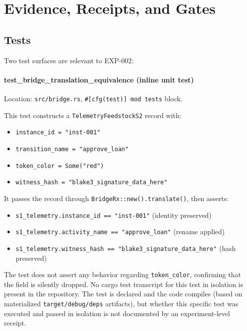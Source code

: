 
\section{Evidence, Receipts, and Gates}
\label{sec:otel-weaver-exp-002-diff-to-residual-evidence}

\subsection{Tests}
\label{sec:otel-weaver-exp-002-diff-to-residual-evidence-tests}

Two test surfaces are relevant to EXP-002:

\paragraph{test\_bridge\_translation\_equivalence (inline unit test)}
Location: \texttt{src/bridge.rs}, \texttt{\#[cfg(test)] mod tests} block.

This test constructs a \texttt{TelemetryFeedstockS2} record with:
\begin{itemize}
    \item \texttt{instance\_id = "inst-001"}
    \item \texttt{transition\_name = "approve\_loan"}
    \item \texttt{token\_color = Some("red")}
    \item \texttt{witness\_hash = "blake3\_signature\_data\_here"}
\end{itemize}
It passes the record through \texttt{BridgeRx::new().translate()}, then asserts:
\begin{itemize}
    \item \texttt{s1\_telemetry.instance\_id == "inst-001"} (identity preserved)
    \item \texttt{s1\_telemetry.activity\_name == "approve\_loan"} (rename applied)
    \item \texttt{s1\_telemetry.witness\_hash == "blake3\_signature\_data\_here"}
          (hash preserved)
\end{itemize}

The test does not assert any behavior regarding \texttt{token\_color}, confirming
that the field is silently dropped. No cargo test transcript for this test in
isolation is present in the repository. The test is declared and the code compiles
(based on materialized \texttt{target/debug/deps} artifacts), but whether this
specific test was executed and passed in isolation is not documented by an
experiment-level receipt.

